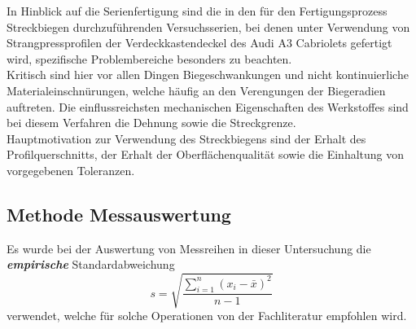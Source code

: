 \documentclass[12pt,a4paper,parskip,twoside,BCOR5mm,headsepline]{scrartcl}
\begin{document}
In Hinblick auf die Serienfertigung sind die in den für den Fertigungsprozess  Streckbiegen durchzuführenden Versuchsserien, bei denen unter Verwendung von Strangpressprofilen der Verdeckkastendeckel des Audi A3 Cabriolets gefertigt wird, spezifische Problembereiche besonders zu beachten.\\
Kritisch sind hier vor allen Dingen Biegeschwankungen und nicht kontinuierliche Materialeinschnürungen,  welche häufig an den Verengungen der Biegeradien auftreten. Die einflussreichsten mechanischen Eigenschaften des Werkstoffes sind bei diesem Verfahren die Dehnung sowie die Streckgrenze.\\
Hauptmotivation zur Verwendung des Streckbiegens sind der Erhalt des Profilquerschnitts, der Erhalt der Oberflächenqualität sowie die Einhaltung von vorgegebenen Toleranzen. 














  











\subsection{Methode Messauswertung}
Es wurde bei der Auswertung von Messreihen in dieser Untersuchung  die \textbf{\emph{empirische}} Standardabweichung 
\begin{equation}
 s= \sqrt{\frac{\sum \limits_{i=1}^n (x_i - \bar{x})^2}{n-1}} 
\end{equation}  verwendet, welche für solche Operationen von der Fachliteratur empfohlen wird.        
  \autocite[301]{mf} 
\end{document}
